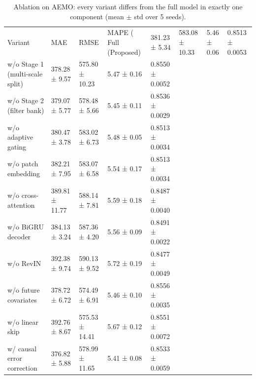\begin{table}
\caption{Ablation on AEMO: every variant differs from the full model in exactly one component (mean $\pm$ std over 5 seeds).}
\label{tab:ablation}
\begin{tabular}{lllll}
\toprule
Variant & MAE & RMSE & MAPE (%
\midrule
Full (Proposed) & 381.23 ± 5.34 & 583.08 ± 10.33 & 5.46 ± 0.06 & 0.8513 ± 0.0053 \\
w/o Stage 1 (multi-scale split) & 378.28 ± 9.57 & 575.80 ± 10.23 & 5.47 ± 0.16 & 0.8550 ± 0.0052 \\
w/o Stage 2 (filter bank) & 379.07 ± 5.77 & 578.48 ± 5.66 & 5.45 ± 0.11 & 0.8536 ± 0.0029 \\
w/o adaptive gating & 380.47 ± 3.78 & 583.02 ± 6.73 & 5.48 ± 0.05 & 0.8513 ± 0.0034 \\
w/o patch embedding & 382.21 ± 7.95 & 583.07 ± 6.58 & 5.54 ± 0.17 & 0.8513 ± 0.0034 \\
w/o cross-attention & 389.81 ± 11.77 & 588.14 ± 7.81 & 5.59 ± 0.18 & 0.8487 ± 0.0040 \\
w/o BiGRU decoder & 384.13 ± 3.24 & 587.36 ± 4.20 & 5.56 ± 0.09 & 0.8491 ± 0.0022 \\
w/o RevIN & 392.38 ± 9.74 & 590.13 ± 9.52 & 5.72 ± 0.19 & 0.8477 ± 0.0049 \\
w/o future covariates & 378.72 ± 6.72 & 574.49 ± 6.91 & 5.46 ± 0.10 & 0.8556 ± 0.0035 \\
w/o linear skip & 392.76 ± 8.67 & 575.53 ± 14.41 & 5.67 ± 0.12 & 0.8551 ± 0.0072 \\
w/ causal error correction & 376.82 ± 5.88 & 578.99 ± 11.65 & 5.41 ± 0.08 & 0.8533 ± 0.0059 \\
\bottomrule
\end{tabular}
\end{table}
